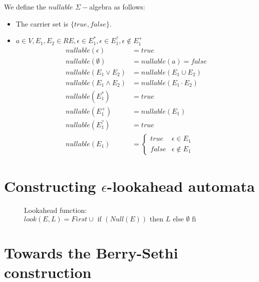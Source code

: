 \begin{definition}
	We define the $nullable$ $\Sigma-$algebra as follows:
	\begin{itemize}
	\item The carrier set is $\{true,false\}$.
	\item $a\in V,E_1,E_2\in RE, \epsilon\in E_1^\ast,\epsilon\in E_1^?,\epsilon\notin E_1^+$
		\begin{align*}
			nullable(\epsilon) &= true \\
			nullable(\emptyset)&=nullable(a)=false \\
			nullable(E_1\lor E_2) &=nullable(E_1\cup E_2)\\
			nullable(E_1\land E_2) &=nullable(E_1\cdot E_2) \\
			nullable(E_1^\ast) &= true\\
			nullable(E_1^+) &=nullable(E_1) \\
			nullable(E_1^?) &=true\\
			nullable(E_1) &=
			\begin{cases}
				true   & \epsilon\in E_1\\
				false  & \epsilon\notin E_1
			\end{cases}
		\end{align*}
	\end{itemize}
\end{definition}


\section{Constructing $\epsilon$-lookahead automata}

\begin{figure}[htbp]
\caption{Lookahead function:$look(E,L)=First\cup\text{ if }(Null(E))\text{ then }L \text{ else } \emptyset \text{ fi }$}
\end{figure}


\section{Towards the Berry-Sethi construction}

